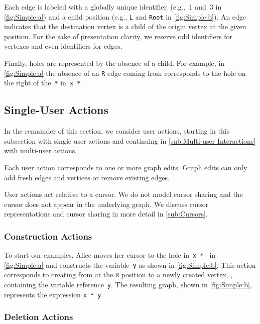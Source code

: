 Each edge is labeled with a globally unique identifier~(e.g.,~1 and~3 in \autoref{fig:Simple:a}) and
a child position (e.g., \texttt{L} and \texttt{Root} in \autoref{fig:Simple:b}).
An edge indicates that the destination vertex is a child of the origin vertex at the given position.
For the sake of presentation clarity, we reserve odd identifiers for vertexes and even identifiers for edges.

Finally, holes are represented by the absence of a child.
For example, in \autoref{fig:Simple:a} the absence of an \texttt{R} edge coming from \vSimpleTimes{}
corresponds to the hole on the right of the~\texttt{*} in~\texttt{x * \hole}.

\figureWrapMove{}

\subsection{Single-User Actions}%
\label{sub:Single-User Actions}

In the remainder of this section,
we consider user actions, starting
in this subsection with single-user
actions and continuing in \autoref{sub:Multi-user Interactions}
with multi-user actions.

Each user action corresponds to one or more graph edits.
Graph edits can only add fresh edges and vertices or remove existing edges.

User actions act relative to a cursor.
We do not model cursor sharing and the cursor does not appear in the underlying graph.
We discuss cursor representations and cursor sharing in more detail in \autoref{sub:Cursors}.

\subsubsection{Construction Actions}%
\label{sub:Construction}

To start our examples, Alice moves her cursor to the hole in~\texttt{x * \hole} in \autoref{fig:Simple:a}
and constructs the variable~\texttt{y} as shown in \autoref{fig:Simple:b}.
This action corresponds to creating \eSimpleY{} from \vSimpleTimes{} at the \texttt{R} position to a newly
created vertex, \vSimpleY{}, containing the variable reference~\texttt{y}.
The resulting graph, shown in \autoref{fig:Simple:b}, represents the expression \texttt{x * y}.

\subsubsection{Deletion Actions}%
\label{sub:Deletion}

